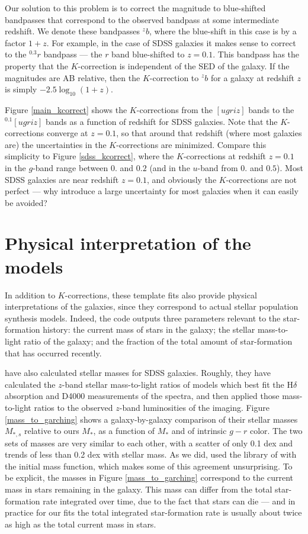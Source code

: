\documentclass[10pt,preprint]{aastex}
\newcommand{\band}[2]{\ensuremath{^{{#1}}\!{#2}}}
\begin{document}
Our solution to this problem is to correct the magnitude to
blue-shifted bandpasses that correspond to the observed bandpass at
some intermediate redshift. We denote these bandpasses \band{z}{b},
where the blue-shift in this case is by a factor $1+z$. For example,
in the case of SDSS galaxies it makes sense to correct to the
\band{0.3}{r} bandpass --- the $r$ band blue-shifted to $z=0.1$. This
bandpass has the property that the $K$-correction is independent of
the SED of the galaxy. If the magnitudes are AB relative, then the
$K$-correction to \band{z}{b} for a galaxy at redshift $z$ is simply
$-2.5\log_{10} (1+z)$.

Figure \ref{main_kcorrect} shows the $K$-corrections from the
$[ugriz]$ bands to the $\band{0.1}{[ugriz]}$ bands as a function of
redshift for SDSS galaxies. Note that the $K$-corrections converge at
$z=0.1$, so that around that redshift (where most galaxies are) the
uncertainties in the $K$-corrections are minimized. Compare this
simplicity to Figure \ref{sdss_kcorrect}, where the $K$-corrections at
redshift $z=0.1$ in the $g$-band range between $0.$ and $0.2$ (and in
the $u$-band from $0.$ and $0.5$). Most SDSS galaxies are near
redshift $z=0.1$, and obviously the $K$-corrections are not perfect
--- why introduce a large uncertainty for most galaxies when it can
easily be avoided?

\section{Physical interpretation of the models}

In addition to $K$-corrections, these template fits also provide
physical interpretations of the galaxies, since they correspond to
actual stellar population synthesis models. Indeed, the code outputs
three parameters relevant to the star-formation history: the current
mass of stars in the galaxy; the stellar mass-to-light ratio of the
galaxy; and the fraction of the total amount of star-formation that
has occurred recently. 

\citet{kauffmann03a} have also calculated stellar masses for SDSS
galaxies. Roughly, they have calculated the $z$-band stellar
mass-to-light ratios of models which best fit the H$\delta$ absorption
and D4000 measurements of the spectra, and then applied those
mass-to-light ratios to the observed $z$-band luminosities of the
imaging. Figure \ref{mass_to_garching} shows a galaxy-by-galaxy
comparison of their stellar masses $M_{\ast,s}$ relative to ours
$M_\ast$, as a function of $M_\ast$ and of intrinsic $g-r$ color. The
two sets of masses are very similar to each other, with a scatter of
only 0.1 dex and trends of less than 0.2 dex with stellar mass. As we
did, \citet{kauffmann03a} used the library of \citet{bruzual03a} with
the \citet{chabrier03a} initial mass function, which makes some of this
agreement unsurprising.  To be explicit, the masses in Figure
\ref{mass_to_garching} correspond to the current mass in stars
remaining in the galaxy. This mass can differ from the total
star-formation rate integrated over time, due to the fact that stars
can die --- and in practice for our fits the total integrated
star-formation rate is usually about twice as high as the total
current mass in stars.
\end{document}
